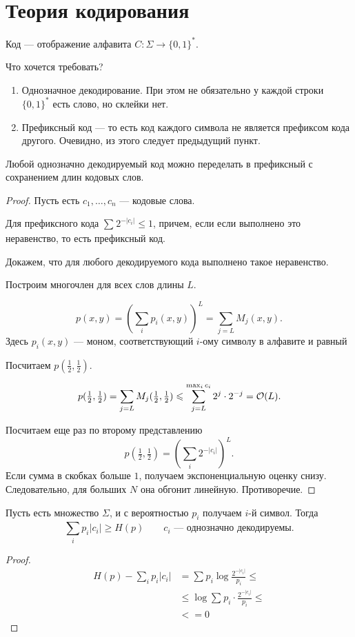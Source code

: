 \section{Теория кодирования}
Код --- отображение алфавита $ C \colon \Sigma \to \{0, 1\}^{*}$.

Что хочется требовать?
\begin{enumerate}
    \item Однозначное декодирование. При этом не обязательно у каждой строки $ \{0, 1\}^{*}$ есть слово, но склейки нет.
	\item Префиксный код --- то есть код каждого символа не является префиксом кода другого. Очевидно, из этого следует предыдущий пункт.
\end{enumerate} 

\begin{thm}
    Любой однозначно декодируемый код можно переделать в префиксный с сохранением длин кодовых слов.
\end{thm}
\begin{proof}
	Пусть есть $  c_1, \ldots , c_n$ --- кодовые слова.

	Для префиксного кода $ \sum_{}^{} 2^{-\lvert c_i \rvert } \le 1$, причем, если если выполнено это неравенство, то есть префиксный код.

	Докажем, что для любого декодируемого кода выполнено такое неравенство.

	Построим многочлен для всех слов длины $ L$.

	\[
		p(x, y) = \left( \sum_{i}^{} p_i(x, y) \right) ^{L} = \sum_{j=L}^{} M_j(x, y)
	.\] 
	Здесь $ p_i(x, y)$ --- моном, соответствующий  $ i$-ому символу в алфавите и равный 

	Посчитаем $ p(\frac{1}{2}, \frac{1}{2})$.

	\[
		p(\tfrac{1}{2},\tfrac{1}{2}) = \sum_{j=L}^{} M_{j}(\tfrac{1}{2},\tfrac{1}{2}) \leqslant \sum_{j=L}^{\max_{i} c_i}2^{j} \cdot 2 ^{-j} = \mathcal{O}(L)
	.\] 

	Посчитаем еще раз по второму представлению
	\[
		p(\tfrac{1}{2},\tfrac{1}{2}) = \left( \sum_{i}^{} 2^{-\lvert c_i \rvert } \right) ^{L}
	.\] 
	Если сумма в скобках больше $ 1$, получаем экспоненциальную оценку снизу.
	Следовательно, для больших $ N$ она обгонит линейную. Противоречие.
\end{proof}


\begin{thm}[Шеннон]
Пусть есть множество $ \Sigma $, и с вероятностью $ p_i$ получаем  $ i$-й символ.
   Тогда
   \[
	   \sum_{i}^{} p_i \lvert c_i \rvert  \ge H(p) \qquad  c_i \text{ --- однозначно декодируемы}
   .\] 
\end{thm}
\begin{proof}
	\begin{align*}
		H(p) - \sum_{i}^{} p_i \lvert c_i \rvert &= \sum_{}^{} p_i \log \frac{2^{-\lvert c_i \rvert }}{p_i} \le \tag{Неравенство Йенсена}\\
												 & \le  \log \sum_{}^{} p_i \cdot \frac{2^{-\lvert c_i \rvert }}{p_i} \le \tag{Неравенство Крафта} \\
												 & <= 0
	\end{align*}
\end{proof}



